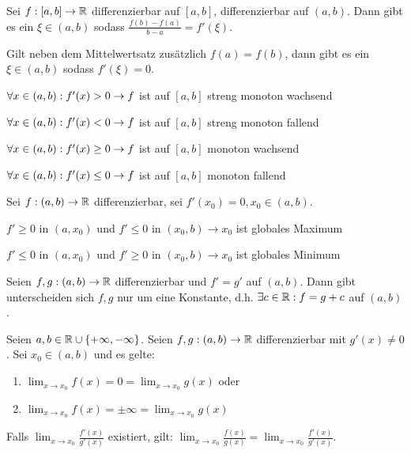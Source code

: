 \begin{satz}[Mittelwertsatz]
	Sei $f : [a,b] \rightarrow \mathbb{R}$ differenzierbar auf $[a,b]$, differenzierbar auf $(a,b)$. Dann gibt es ein $\xi \in (a,b)$ sodass $\frac{f(b) - f(a)}{b - a} = f'(\xi)$.
\end{satz}

\begin{satz}
	Gilt neben dem Mittelwertsatz zusätzlich $f(a) = f(b)$, dann gibt es ein $\xi \in (a,b)$ sodass $f'(\xi) = 0$.
\end{satz}

\begin{satz}
	\begin{description}[noitemsep]
		\item $\forall x \in (a,b): f'(x) > 0 \rightarrow f$ ist auf $[a,b]$ streng monoton wachsend
		\item $\forall x \in (a,b): f'(x) < 0 \rightarrow f$ ist auf $[a,b]$ streng monoton fallend
		\item $\forall x \in (a,b): f'(x) \geq 0 \rightarrow f$ ist auf $[a,b]$ monoton wachsend
		\item $\forall x \in (a,b): f'(x) \leq 0 \rightarrow f$ ist auf $[a,b]$ monoton fallend
	\end{description}
\end{satz}

\begin{satz}
	Sei $f : (a,b) \rightarrow \mathbb{R}$ differenzierbar, sei $f'(x_0) = 0, x_0 \in (a,b)$.
	\begin{description}[noitemsep]
		\item $f' \geq 0$ in $(a, x_0)$ und $f' \leq 0$ in $(x_0, b) \rightarrow x_0$ ist globales Maximum
		\item $f' \leq 0$ in $(a, x_0)$ und $f' \geq 0$ in $(x_0, b) \rightarrow x_0$ ist globales Minimum
	\end{description}
\end{satz}

\begin{satz}
	Seien $f,g : (a,b) \rightarrow \mathbb{R}$ differenzierbar und $f' = g'$ auf $(a,b)$. Dann gibt unterscheiden sich $f,g$ nur um eine Konstante, d.h. $\exists c \in \mathbb{R} : f = g + c$ auf $(a,b)$.
\end{satz}

\begin{satz}[L'Hospital]
	Seien $a,b \in \mathbb{R} \cup \{+ \infty, - \infty\}$. Seien $f, g : (a,b) \rightarrow \mathbb{R}$ differenzierbar mit $g'(x) \neq 0$. Sei $x_0 \in (a,b)$ und es gelte:
	\begin{enumerate}[noitemsep]
		\item $\lim_{x \rightarrow x_0} f(x) = 0 = \lim_{x \rightarrow x_0} g(x)$ oder
		\item$\lim_{x \rightarrow x_0} f(x) = \pm \infty = \lim_{x \rightarrow x_0} g(x)$
	\end{enumerate}
	Falls $\lim_{x \rightarrow x_0} \frac{f'(x)}{g'(x)}$ existiert, gilt: $\lim_{x \rightarrow x_0} \frac{f(x)}{g(x)} = \lim_{x \rightarrow x_0} \frac{f'(x)}{g'(x)}$.
\end{satz}


